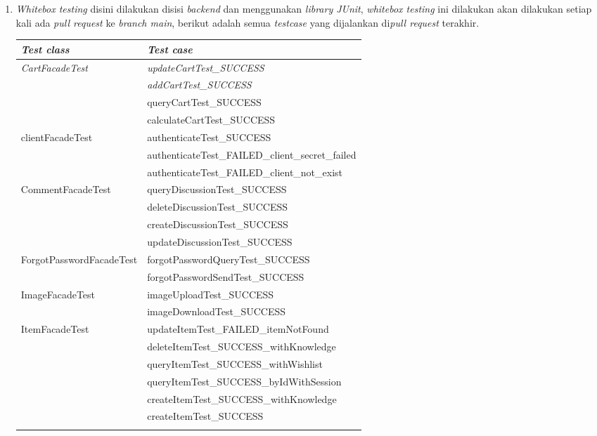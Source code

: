 \documentclass[a4paper]{article}
\begin{document}
\begin{enumerate}
    \item \textit{Whitebox testing} disini dilakukan disisi \textit{backend} dan menggunakan \textit{library JUnit}, \textit{whitebox testing} ini dilakukan akan dilakukan setiap kali ada \textit{pull request} ke \textit{branch main}, berikut adalah semua \textit{testcase} yang dijalankan di\textit{pull request} terakhir.
\begin{longtable}[c]{|l|l|}
\hline
\textit{Test class} & \textit{Test case} \\ \hline
\endfirsthead
\endhead
\multirow{4}{*}{\textit{CartFacadeTest}} & \textit{updateCartTest\_SUCCESS} \\ \cline{2-2} 
 & \textit{addCartTest\_SUCCESS} \\ \cline{2-2} 
 & queryCartTest\_SUCCESS \\ \cline{2-2} 
 & calculateCartTest\_SUCCESS \\ \hline
\multirow{3}{*}{clientFacadeTest} & authenticateTest\_SUCCESS \\ \cline{2-2} 
 & authenticateTest\_FAILED\_client\_secret\_failed \\ \cline{2-2} 
 & authenticateTest\_FAILED\_client\_not\_exist \\ \hline
\multirow{4}{*}{CommentFacadeTest} & queryDiscussionTest\_SUCCESS \\ \cline{2-2} 
 & deleteDiscussionTest\_SUCCESS \\ \cline{2-2} 
 & createDiscussionTest\_SUCCESS \\ \cline{2-2} 
 & updateDiscussionTest\_SUCCESS \\ \hline
\multirow{2}{*}{ForgotPasswordFacadeTest} & forgotPasswordQueryTest\_SUCCESS \\ \cline{2-2} 
 & forgotPasswordSendTest\_SUCCESS \\ \hline
\multirow{2}{*}{ImageFacadeTest} & imageUploadTest\_SUCCESS \\ \cline{2-2} 
 & imageDownloadTest\_SUCCESS \\ \hline
\multirow{15}{*}{ItemFacadeTest} & updateItemTest\_FAILED\_itemNotFound \\ \cline{2-2} 
 & deleteItemTest\_SUCCESS\_withKnowledge \\ \cline{2-2} 
 & queryItemTest\_SUCCESS\_withWishlist \\ \cline{2-2} 
 & queryItemTest\_SUCCESS\_byIdWithSession \\ \cline{2-2} 
 & createItemTest\_SUCCESS\_withKnowledge \\ \cline{2-2} 
 & createItemTest\_SUCCESS \\ \cline{2-2} 

\end{longtable}
\end{enumerate}
\end{document}
